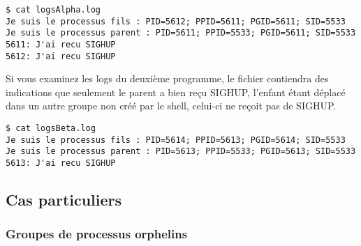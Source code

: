 \begin{lstlisting}
$ cat logsAlpha.log
Je suis le processus fils : PID=5612; PPID=5611; PGID=5611; SID=5533 
Je suis le processus parent : PID=5611; PPID=5533; PGID=5611; SID=5533 
5611: J'ai recu SIGHUP
5612: J'ai recu SIGHUP
\end{lstlisting}

Si vous examinez les logs du deuxième programme, le fichier contiendra des indications que seulement le parent a bien reçu SIGHUP,
l'enfant étant déplacé dans un autre groupe non créé par le shell, celui-ci ne reçoit pas de SIGHUP.

\begin{lstlisting}
$ cat logsBeta.log
Je suis le processus fils : PID=5614; PPID=5613; PGID=5614; SID=5533
Je suis le processus parent : PID=5613; PPID=5533; PGID=5613; SID=5533
5613: J'ai recu SIGHUP
\end{lstlisting}

\subsection{Cas particuliers}

\subsubsection{Groupes de processus orphelins}

